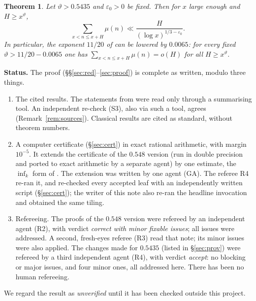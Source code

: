 \documentclass[11pt]{amsart}
\newtheorem{theorem}{Theorem}[section]
\theoremstyle{definition}
\theoremstyle{remark}
\newcommand{\e}{\varepsilon}
\begin{document}
\begin{theorem}\label{thm:main}
Let $\vartheta>0.5435$ and $\e_0>0$ be fixed. Then for $x$ large enough and $H\ge x^{\vartheta}$,
\[
\sum_{x<n\le x+H}\mu(n)\ll \frac{H}{(\log x)^{1/3-\e_0}}.
\]
In particular, the exponent $11/20$ of \cite{MT} can be lowered by $0.0065$: for every fixed $\vartheta>11/20-0.0065$ one has
$\sum_{x<n\le x+H}\mu(n)=o(H)$ for all $H\ge x^{\vartheta}$.
\end{theorem}

\noindent\textbf{Status.} The proof (\S\S\ref{sec:red}--\ref{sec:proof}) is complete as written, modulo three things.
\begin{enumerate}[label=(\alph*),leftmargin=*]
\item The cited results. The statements from \cite{MT} were read only through a summarising tool. An independent re-check (S3), also via
such a tool, agrees (Remark~\ref{rem:sources}). Classical results are cited as standard, without theorem numbers.
\item A computer certificate (\S\ref{sec:cert}) in exact rational arithmetic, with margin $10^{-5}$. It extends the certificate of the
$0.548$ version (run in double precision and ported to exact arithmetic by a separate agent) by one estimate, the $\inf_k$ form of
\cite[Proposition~12.1]{GM}. The extension was written by one agent (GA). The referee R4 re-ran it, and re-checked every accepted
leaf with an independently written script (\S\ref{sec:cert}); the writer of this note also re-ran the headline invocation and obtained the same tiling.
\item Refereeing. The proofs of the $0.548$ version were refereed by an independent agent (R2), with verdict \emph{correct with minor fixable
issues}; all issues were addressed. A second, fresh-eyes referee (R3) read that note; its minor issues were also applied. The changes made for
$0.5435$ (listed in \S\ref{sec:prov}) were refereed by a third independent agent (R4), with verdict \emph{accept}: no blocking or major
issues, and four minor ones, all addressed here. There has been no human refereeing.
\end{enumerate}
We regard the result as \emph{unverified} until it has been checked outside this project.
\end{document}
